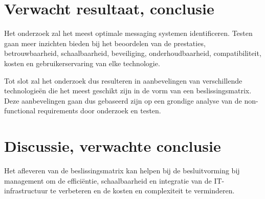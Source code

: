 \section{Verwacht resultaat, conclusie}%

\label{sec:verwachte-resultaten}




Het onderzoek zal het meest optimale messaging systemen identificeren.
Testen gaan meer inzichten bieden bij het beoordelen van de prestaties, betrouwbaarheid, 
schaalbaarheid, beveiliging, onderhoudbaarheid, compatibiliteit, kosten en gebruikerservaring van elke technologie.
\newline

Tot slot zal het onderzoek dus resulteren in aanbevelingen van verschillende technologieën die het meest geschikt zijn
in de vorm van een beslissingsmatrix. 
Deze aanbevelingen gaan dus gebaseerd zijn op een grondige analyse van de non-functional requirements 
door onderzoek en testen.


\section{Discussie, verwachte conclusie}%
\label{sec:discussie-conclusie}

Het afleveren van de beslissingsmatrix kan helpen bij de besluitvorming bij management om de efficiëntie, schaalbaarheid en integratie van de IT-infrastructuur te verbeteren
en de kosten en complexiteit te verminderen. 
